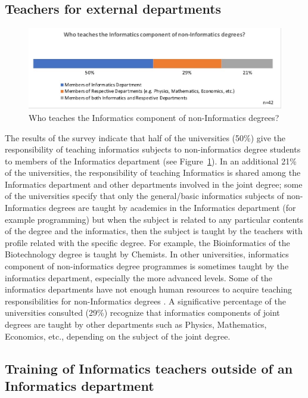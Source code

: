 \subsection{Teachers for external departments}
\begin{figure}[h]
\includegraphics[width = \linewidth]{charts/2c.jpg}
\caption{Who teaches the Informatics component of non-Informatics degrees?}
\label{sect3:teachers}
\end{figure}

The results of the survey indicate that half of the universities (50\%) give the responsibility of teaching informatics subjects to non-informatics degree students to members of the Informatics department (see Figure~\ref{sect3:teachers}). In an additional 21\% of the universities, the responsibility of teaching Informatics is shared among the Informatics department and other departments involved in the joint degree; some of the universities specify that only the general/basic informatics subjects of non-Informatics degrees are taught by academics in the Informatics department (for example programming) but when the subject is related to any particular contents of the degree and the informatics, then the subject is taught by the teachers with profile related with the specific degree. For example, the Bioinformatics of the Biotechnology degree is taught by Chemists. In other universities, informatics component of non-informatics degree programmes is sometimes taught by the informatics department, especially the more advanced levels. Some of the informatics departments have not enough human resources to acquire teaching responsibilities  for non-Informatics degrees . A significative percentage of the universities consulted (29\%) recognize that informatics components of joint degrees are taught by other departments such as Physics, Mathematics, Economics, etc., depending on the subject of the joint degree.

\subsection{Training of Informatics teachers outside of an Informatics department}

